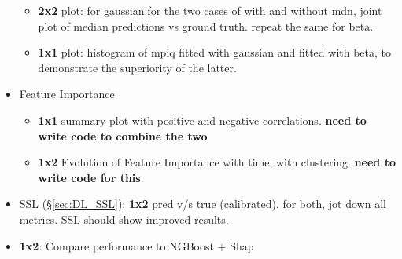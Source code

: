 \begin{itemize}
    \begin{itemize}
        \item \textbf{2x2} plot: for gaussian:for the two cases of with and without mdn, joint plot of median predictions vs ground truth. repeat the same for beta.
        \item \textbf{1x1} plot: histogram of mpiq fitted with gaussian and fitted with beta, to demonstrate the superiority of the latter.
    \end{itemize}
    \item Feature Importance
    \begin{itemize}
        \item \textbf{1x1} summary plot with positive and negative correlations. \textbf{need to write code to combine the two}
        \item \textbf{1x2} Evolution of Feature Importance with time, with clustering. \textbf{need to write code for this}.
    \end{itemize}
    \item SSL (\S\ref{sec:DL_SSL}): \textbf{1x2} pred v/s true (calibrated). for both, jot down all metrics. SSL should show improved results.
    \item \textbf{1x2}: Compare performance to NGBoost + Shap
\end{itemize}
